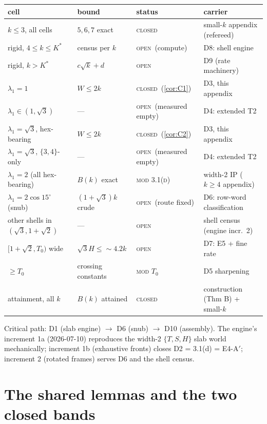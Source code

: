 \documentclass[11pt,a4paper,oneside]{article}
\theoremstyle{plain}
\theoremstyle{remark}
\newcommand{\Bk}{B(k)}
\newcommand{\statDONE}{\textcolor{green!50!black}{\textsc{closed}}}
\newcommand{\statOPEN}{\textcolor{red!60!black}{\textsc{open}}}
\newcommand{\statCOND}[1]{\textcolor{orange!70!black}{\textsc{mod #1}}}
\begin{document}
\begin{center}
\begin{tabular}{llll}
\toprule
cell & bound & status & carrier\\
\midrule
$k \le 3$, all cells & $5, 6, 7$ exact & \statDONE & small-$k$ appendix (refereed)\\
rigid, $4 \le k \le K^*$ & census per $k$ & \statOPEN\ (compute) & D8: shell engine\\
rigid, $k > K^*$ & $c\sqrt k + d$ & \statOPEN & D9 (rate machinery)\\
$\lambda_1 = 1$ & $W \le 2k$ & \statDONE\ (\cref{cor:C1}) & D3, this appendix\\
$\lambda_1 \in (1, \sqrt3)$ & --- & \statOPEN\ (measured empty) & D4: extended T2\\
$\lambda_1 = \sqrt3$, hex-bearing & $W \le 2k$ & \statDONE\ (\cref{cor:C2}) & D3, this appendix\\
$\lambda_1 = \sqrt3$, $\{3,4\}$-only & --- & \statOPEN\ (measured empty) & D4: extended T2\\
$\lambda_1 = 2$ (all hex-bearing) & $\Bk$ exact & \statCOND{3.1(d)} & width-2 IP ($k{\ge}4$ appendix)\\
$\lambda_1 = 2\cos 15^\circ$ (snub) & $(1{+}\sqrt3)k$ crude & \statOPEN\ (route fixed) & D6: row-word classification\\
other shells in $(\sqrt3, 1{+}\sqrt2)$ & --- & \statOPEN & shell census (engine incr.~2)\\
$[1{+}\sqrt2, T_0)$ wide & $\sqrt3 H \le {\sim}4.2k$ & \statOPEN & D7: E5 + fine rate\\
$\ge T_0$ & crossing constants & \statCOND{$T_0$} & D5 sharpening\\
attainment, all $k$ & $\Bk$ attained & \statDONE & construction (Thm B) + small-$k$\\
\bottomrule
\end{tabular}
\end{center}

Critical path: D1 (slab engine) $\to$ D6 (snub) $\to$ D10 (assembly). The engine's
increment 1a (2026-07-10) reproduces the width-2 $\{T,S,H\}$ slab world mechanically;
increment 1b (exhaustive fronts) closes D2 = 3.1(d) = E4-A$'$; increment 2 (rotated
frames) serves D6 and the shell census.

\section{The shared lemmas and the two closed bands}\label{sec:closed}
\end{document}
